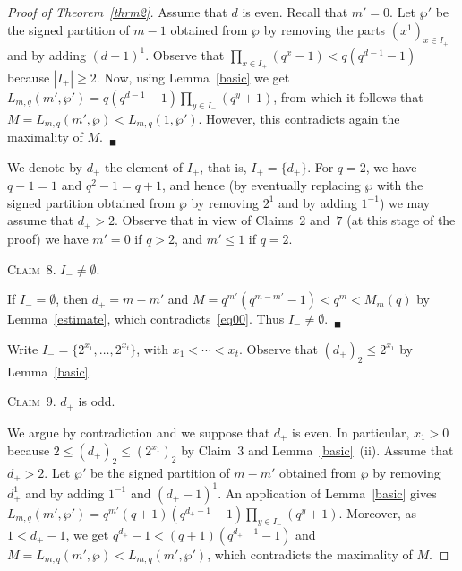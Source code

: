 \documentclass{amsart}
\begin{document}
\begin{proof}[Proof of Theorem~\ref{thrm2}]
Assume that $d$ is even. Recall that $m'=0$.  Let $\wp'$ be the signed partition of $m-1$ obtained from $\wp$ by removing the parts $(x^1)_{x\in I_+}$ and by adding $(d-1)^1$. Observe that $\prod_{x\in I_+}(q^x-1)<q(q^{d-1}-1)$ because $|I_+|\geq 2$. Now, using Lemma~\ref{basic} we get $L_{m,q}(m',\wp')=q(q^{d-1}-1)\prod_{y\in I_-}(q^y+1)$, from which it follows that $M=L_{m,q}(m',\wp)<L_{m,q}(1,\wp')$. However, this contradicts again the maximality of $M$.~$_\blacksquare$ 

\smallskip

We denote by $d_+$ the element of $I_+$, that is, $I_+=\{d_+\}$. For  $q=2$, we have $q-1=1$ and 
$ q^2-1=q+1$, and hence (by eventually replacing $\wp$ with the signed partition obtained from $\wp$ by removing $2^1$ and by adding $1^{-1}$) we may assume that $d_+> 2$. Observe that in view of Claims~$2$ and~$7$ (at this stage of the proof) we have $m'=0$ if $q>2$, and $m'\leq 1$ if $q=2$.

\smallskip

\noindent\textsc{Claim~$8$. }$I_-\neq\emptyset$.

\smallskip

\noindent If $I_{-}=\emptyset$, then $d_+=m-m'$ and $M=q^{m'}(q^{m-m'}-1)<q^{m}< M_m(q)$ by Lemma~\ref{estimate}, which contradicts~\eqref{eq00}. Thus $I_{-}\neq \emptyset$.~$_\blacksquare$ 

\smallskip

Write $I_-=\{2^{x_1},\ldots,2^{x_t}\}$, with $x_1<\cdots<x_t$. Observe that $(d_+)_2\leq 2^{x_1}$ by Lemma~\ref{basic}. 

\smallskip

\noindent\textsc{Claim~$9$. }$d_+$ is odd.

\smallskip

\noindent We argue by contradiction and we suppose that $d_+$ is even. In particular, $x_1>0$ because $2\leq (d_+)_2\leq (2^{x_1})_2$ by Claim~$3$ and Lemma~\ref{basic}~(ii). Assume that $d_+>2$. Let $\wp'$ be the signed partition of $m-m'$ obtained from $\wp$ by removing $d_+^1$ and by adding  $1^{-1}$ and $(d_+-1)^{1}$. An application of Lemma~\ref{basic} gives $L_{m,q}(m',\wp')=q^{m'}(q+1)(q^{d_+-1}-1)\prod_{y\in I_-}(q^{y}+1)$. Moreover, as $1<d_+-1$, we get $q^{d_+}-1<(q+1)(q^{d_+-1}-1)$ and $M=L_{m,q}(m',\wp)<L_{m,q}(m',\wp')$, which contradicts the maximality of $M$. 


\end{proof}
\end{document}
